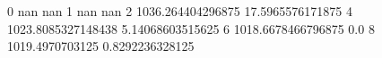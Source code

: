 0 nan nan
1 nan nan
2 1036.264404296875 17.5965576171875
4 1023.8085327148438 5.14068603515625
6 1018.6678466796875 0.0
8 1019.4970703125 0.8292236328125
